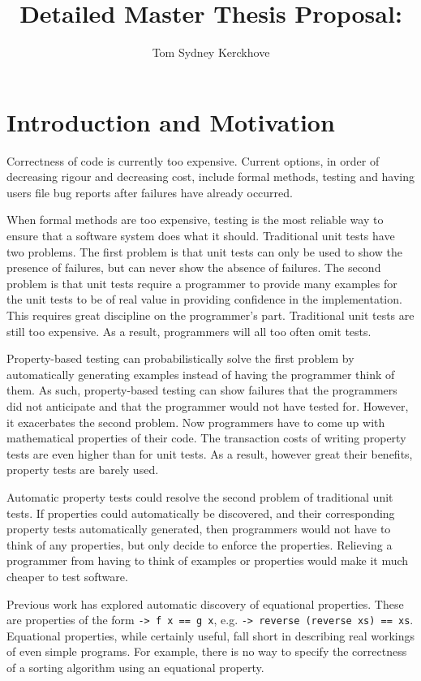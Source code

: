 \documentclass[a4paper, 11pt, onepage]{article}
\title{Detailed Master Thesis Proposal:\\\vspace{0.5cm}{\Huge Functional Property Discovery and Corresponding Test Generation in Haskell}}
\author{Tom Sydney Kerckhove}
\begin{document}
\maketitle

\section{Introduction and Motivation}


Correctness of code is currently too expensive.
Current options, in order of decreasing rigour and decreasing cost, include formal methods, testing and having users file bug reports after failures have already occurred.

When formal methods are too expensive, testing is the most reliable way to ensure that a software system does what it should.
Traditional unit tests have two problems.
The first problem is that unit tests can only be used to show the presence of failures, but can never show the absence of failures.
The second problem is that unit tests require a programmer to provide many examples for the unit tests to be of real value in providing confidence in the implementation.
This requires great discipline on the programmer's part.
Traditional unit tests are still too expensive.
As a result, programmers will all too often omit tests.

Property-based testing \cite{QuickCheck} can probabilistically solve the first problem by automatically generating examples instead of having the programmer think of them.
As such, property-based testing can show failures that the programmers did not anticipate and that the programmer would not have tested for.
However, it exacerbates the second problem.
Now programmers have to come up with mathematical properties of their code.
The transaction costs of writing property tests are even higher than for unit tests.
As a result, however great their benefits, property tests are barely used.

Automatic property tests could resolve the second problem of traditional unit tests.
If properties could automatically be discovered, and their corresponding property tests automatically generated, then programmers would not have to think of any properties, but only decide to enforce the properties.
Relieving a programmer from having to think of examples or properties would make it much cheaper to test software.

Previous work \cite{QuickSpec} has explored automatic discovery of equational properties.
These are properties of the form \texttt{\x -> f x == g x}, e.g. \texttt{\xs -> reverse (reverse xs) == xs}.
Equational properties, while certainly useful, fall short in describing real workings of even simple programs.
For example, there is no way to specify the correctness of a sorting algorithm using an equational property.
\end{document}

